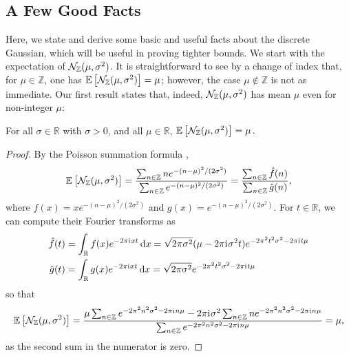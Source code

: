 \documentclass{jpcfinal} %
\newcommand{\ii}{\mathrm{i}\mkern1mu}
\newcommand{\ex}[2]{{\ifx&#1& \mathbb{E} \else
\underset{#1}{\mathbb{E}} \fi \left[#2\right]}}
\newcommand{\dx}[1][x]{\mathrm{d}#1}
\newcommand{\Z}{\mathbb{Z}}
\newcommand{\R}{\mathbb{R}}
\begin{document}
\subsection{A Few Good Facts}
\label{sec:good-facts}
Here, we state and derive some basic and useful facts about the discrete Gaussian, which will be useful in proving tighter bounds. 
We start with the expectation of $\discN(\mu,\sigma^2)$. It is straightforward to see by a change of index that, for $\mu\in\Z$, 
one has $\ex{}{\discN(\mu,\sigma^2)} = \mu$; however, the case $\mu\notin\Z$ is not as immediate. Our first result states that, 
indeed, $\discN(\mu,\sigma^2)$ has mean $\mu$ even for non-integer $\mu$:
\begin{fact}[Expectation]\label{fact:expectation}
    For all $\sigma \in \R$ with $\sigma>0$, and all $\mu\in\R$,
    $
       \ex{}{\discN(\mu,\sigma^2)} = \mu\,.
    $
\end{fact}
\begin{proof}
By the Poisson summation formula \citep{poisson,poisson2},
\[
        \ex{}{\discN(\mu,\sigma^2)}
        = \frac{\sum_{n\in\Z} n e^{-(n-\mu)^2/(2\sigma^2)}}{\sum_{n\in\Z} e^{-(n-\mu)^2/(2\sigma^2)}}
        = \frac{\sum_{n\in\Z} \hat{f}(n)}{\sum_{n\in\Z} \hat{g}(n)},
\]
where $f(x) = xe^{-(n-\mu)^2/(2\sigma^2)}$ and $g(x) = e^{-(n-\mu)^2/(2\sigma^2)}$. For $t\in\R$, we can compute their Fourier transforms as
\begin{align*}
    \hat{f}(t) &= \int_{\R} f(x) e^{-2\pi\ii{}x t}\,\dx = \sqrt{2\pi\sigma^2}(\mu-2\pi\ii{}\sigma^2 t) e^{-2\pi^2t^2\sigma^2 - 2\pi\ii{}t \mu}\\
    \hat{g}(t) &= \int_{\R} g(x) e^{-2\pi\ii{}x t}\,\dx = \sqrt{2\pi\sigma^2}e^{-2\pi^2t^2\sigma^2 - 2\pi\ii{}t \mu}
\end{align*}
so that
\[
        \ex{}{\discN(\mu,\sigma^2)}
        = \frac{\mu \sum_{n\in\Z}  e^{-2\pi^2n^2\sigma^2 - 2\pi\ii{}n \mu}  -  2\pi\ii{}\sigma^2\sum_{n\in\Z} n e^{-2\pi^2n^2\sigma^2 - 2\pi\ii{}n \mu} }{\sum_{n\in\Z} e^{-2\pi^2n^2\sigma^2 - 2\pi\ii{}n \mu} }
        = \mu,
\]
as the second sum in the numerator is zero.
\end{proof}
\end{document}
